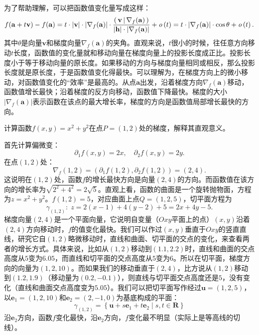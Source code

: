 \documentclass[12pt,UTF8]{ctexbook}
\begin{document}
为了帮助理解，可以把函数值变化量写成这样：
$$ f(\mathbf{a} + t \mathbf{v}) - f(\mathbf{a}) = t \cdot |\mathbf{v}| \cdot |\nabla_f(\mathbf{a})| \cdot \frac{\displaystyle\left( \,\mathbf{v} \,\middle\vert \,\nabla_f(\mathbf{a}) \,\right)}{|\mathbf{h}|\cdot|\nabla_f(\mathbf{a})|}  + \mathit{o}\left(t\right) =  t \cdot |\nabla_f(\mathbf{a})| \cdot \cos{\theta}  + \mathit{o}\left(t\right).$$
其中$\theta$是向量$\mathbf{v}$和梯度向量$\nabla_f(\mathbf{a})$的夹角。直观来说，$t$很小的时候，往任意方向移动$t$长度，函数值的变化量就和移动向量在梯度向量上的投影长度成正比。投影长度小于等于移动向量的原长度。如果移动的方向与梯度向量相同或相反，那么投影长度就是原长度，于是函数值变化得最快。可以理解为，在梯度方向上的微小移动，对函数值变化的“效率”是最高的。从点$\mathbf{a}$出发，沿着梯度方向$\nabla_f(\mathbf{a})$移动，函数值增长最快；沿着梯度的反方向移动，函数值下降最快。梯度的大小$|\nabla_f(\mathbf{a})|$表示函数在该点的最大增长率，梯度的方向是函数值局部增长最快的方向。

\begin{et}
计算函数$f(x,y) = x^2 + y^2$在点$P=(1,2)$处的梯度，解释其直观意义。
\end{et}
\begin{so}
首先计算偏微变：
$$ \partial_1 f(x,y) = 2x, \quad \partial_2 f(x,y) = 2y. $$
在点$(1,2)$处：
$$ \nabla_f(1,2) = (\partial_1 f(1,2), \partial_2 f(1,2)) = (2, 4). $$
这说明在$(1,2)$处，函数$f$的增长最快方向是向量$(2,4)$的方向。而函数值在该方向的增长率为$\sqrt{2^2 + 4^2} = 2\sqrt{5}$。直观上看，函数的曲面是一个旋转抛物面，方程为$z = x^2 + y^2$。$f(1,2) = 5$，对应曲面上点$Q=(1,2,5)$，切平面方程为
$$\gamma_{(1,2)}: \;z = 2(x - 1) + 4(y - 2) + 5 = 2x + 4y - 5. $$
梯度向量$(2,4)$是一个平面向量，它说明自变量（$Oxy$平面上的点）$(x,y)$沿着$(2,4)$方向移动时，$f$的值变化最快。我们可以作过$(x,y)$垂直于$Oxy$的竖直直线，研究它自$(1,2)$略微移动时，直线和曲面、切平面的交点的变化，来查看两者的增长方式。具体来说，比如从$(1,2)$移动到$(1.1,2.2)$时，直线和曲面的交点高度从$5$变为$6.05$，而直线和切平面的交点高度从$5$变为$6$。所以在切平面，梯度方向的向量为$(1,2,10)$。而如果我们的移动垂直于$(2,4)$，比方说从$(1,2)$移动到$(1.2, 1.9)$（移动量为$(0.2, -0.1)$），则直线与切平面交点高度还是$5$，没有变化（直线和曲面交点高度变为$5.05$）。我们可以把切平面写作经过$\mathbf{u}=(1,2,5)$，以$\mathbf{e}_1 = (1,2,10)$和$\mathbf{e}_2 = (2,-1,0)$为基底构成的平面：
$$ \gamma_{(1,2)} = \left\{ \mathbf{u} + s\mathbf{e}_1 + t\mathbf{e}_2 \; | \; s, t \in \mathbf{R}\right\} $$
沿$\mathbf{e}_2$方向，函数$f$变化最快，沿$\mathbf{e}_2$方向，$f$变化最不明显（实际上是等高线的切线）。
\end{so}
\end{document}
